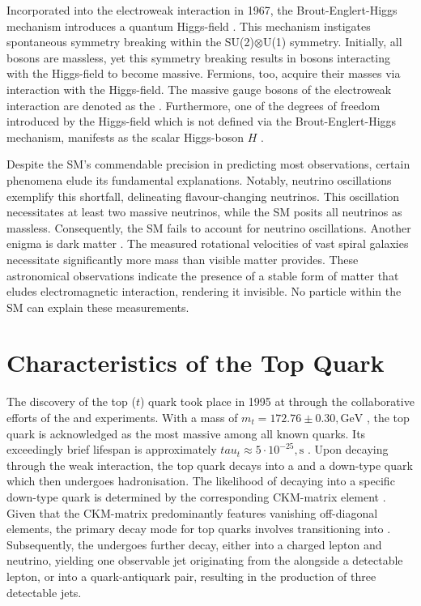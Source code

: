 \documentclass[bachelor,ngerman,english]{GAUBM}
\begin{document}
Incorporated into the electroweak interaction in 1967, the Brout-Englert-Higgs mechanism introduces a quantum Higgs-field \cite{higgs_mechanism_1, higgs_mechanism_2, higgs_mechanism_3}. This mechanism instigates spontaneous symmetry breaking within the SU(2)$\otimes$U(1) symmetry. Initially, all bosons are massless, yet this symmetry breaking results in bosons interacting with the Higgs-field to become massive. Fermions, too, acquire their masses via interaction with the Higgs-field. The massive gauge bosons of the electroweak interaction are denoted as the \zwboson. Furthermore, one of the degrees of freedom introduced by the Higgs-field which is not defined via the Brout-Englert-Higgs mechanism, manifests as the scalar Higgs-boson $H$ \cite{higgs_mechanism_1}.

Despite the SM's commendable precision in predicting most observations, certain phenomena elude its fundamental explanations. Notably, neutrino oscillations \cite{neutrino_oscillation} exemplify this shortfall, delineating flavour-changing neutrinos. This oscillation necessitates at least two massive neutrinos, while the SM posits all neutrinos as massless. Consequently, the SM fails to account for neutrino oscillations. Another enigma is dark matter \cite{dark_matter}. The measured rotational velocities of vast spiral galaxies necessitate significantly more mass than visible matter provides. These astronomical observations indicate the presence of a stable form of matter that eludes electromagnetic interaction, rendering it invisible. No particle within the SM can explain these measurements.


\section{Characteristics of the Top Quark}
\label{sec:theory_top}
The discovery of the top ($t$) quark took place in 1995 at \fermilab through the collaborative efforts of the \dzero \cite{top_production01} and \cdf \cite{top_production02} experiments. With a mass of $m_t=172.76\pm0.30,\text{GeV}$ \cite{top_mass}, the top quark is acknowledged as the most massive among all known quarks. Its exceedingly brief lifespan is approximately $tau_t\approx5\cdot10^{-25},\text{s}$ \cite{top_mass}. Upon decaying through the weak interaction, the top quark decays into a \wboson and a down-type quark which then undergoes hadronisation. The likelihood of decaying into a specific down-type quark is determined by the corresponding CKM-matrix element \cite{ckm_matrix}. Given that the CKM-matrix predominantly features vanishing off-diagonal elements, the primary decay mode for top quarks involves transitioning into \bquarks. Subsequently, the \wboson undergoes further decay, either into a charged lepton and neutrino, yielding one observable jet originating from the \bquark alongside a detectable lepton, or into a quark-antiquark pair, resulting in the production of three detectable jets.
\end{document}

